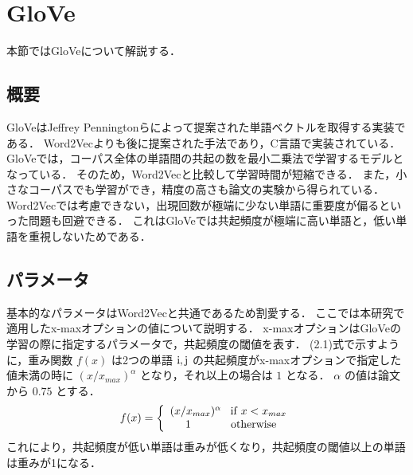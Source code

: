 \section{GloVe}
本節ではGloVeについて解説する．

\subsection{概要}
GloVeはJeffrey Penningtonら\cite{glove}によって提案された単語ベクトルを取得する実装である．
Word2Vecよりも後に提案された手法であり，C言語で実装されている．
GloVeでは，コーパス全体の単語間の共起の数を最小二乗法で学習するモデルとなっている．
そのため，Word2Vecと比較して学習時間が短縮できる．
また，小さなコーパスでも学習ができ，精度の高さも論文の実験から得られている．
Word2Vecでは考慮できない，出現回数が極端に少ない単語に重要度が偏るといった問題も回避できる．
これはGloVeでは共起頻度が極端に高い単語と，低い単語を重視しないためである．

\subsection{パラメータ}
基本的なパラメータはWord2Vecと共通であるため割愛する．
ここでは本研究で適用したx-maxオプションの値について説明する．
x-maxオプションはGloVeの学習の際に指定するパラメータで，共起頻度の閾値を表す．
(2.1)式で示すように，重み関数 $ f(x) $ は2つの単語 $ {\rm i, j} $ の共起頻度がx-maxオプションで指定した値未満の時に 
$ (x/x_{max})^\alpha $ となり，それ以上の場合は $ 1 $ となる．
$ \alpha $ の値は論文から $ 0.75 $ とする．
\begin{equation}
f(x) = \left\{\begin{array}{l}
(x/x_{max})^\alpha \;\;\; {\rm if} \; x < x_{max} \\
\;\;\;\;\; 1 \;\;\;\;\;\;\;\;\;\;\;\;\; {\rm otherwise}
\end{array} \right.
\end{equation}
これにより，共起頻度が低い単語は重みが低くなり，共起頻度の閾値以上の単語は重みが1になる．

